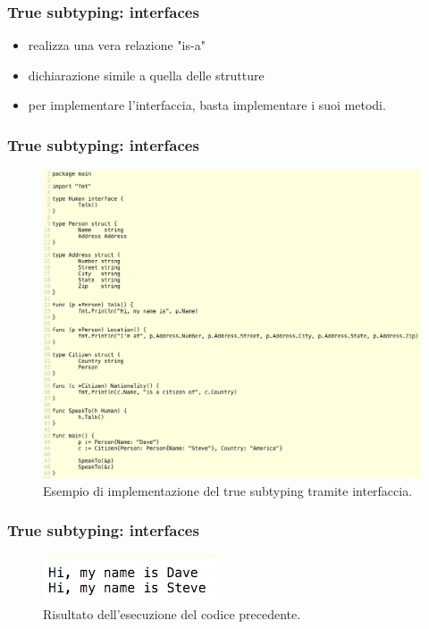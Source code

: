 \documentclass[12pt]{beamer}
\begin{document}
	\begin{frame}
		\frametitle{True subtyping: interfaces}
		\begin{itemize}[<+->]
			\item realizza una vera relazione "is-a"
			\item dichiarazione simile a quella delle strutture
			\item per implementare l'interfaccia, basta implementare i suoi metodi.
		\end{itemize}
	\end{frame}
	
	\begin{frame}
		\frametitle{True subtyping: interfaces}
		\begin{figure}
			\centering
			\includegraphics[width=0.7\linewidth]{interfacecode}
			\caption[Esempio di interfaccia]{Esempio di implementazione del true subtyping tramite interfaccia.}
			\label{fig:interfacecode}
		\end{figure}
	\end{frame}
	
	\begin{frame}
		\frametitle{True subtyping: interfaces}
		\begin{figure}
			\centering
			\includegraphics[width=0.7\linewidth]{interfaceresult}
			\caption[Esempio di interfaccia]{Risultato dell'esecuzione del codice precedente.}
			\label{fig:interfacecode}
		\end{figure}
	\end{frame}
\end{document}
